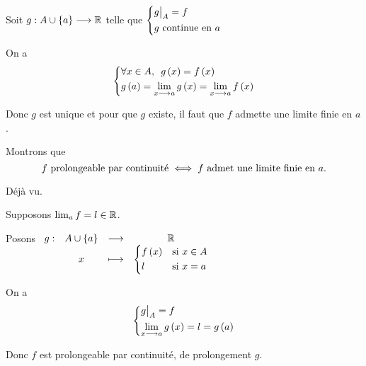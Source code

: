 \begin{dem}
\unicite

Soit \(g:A\cup\left\lbrace a\right\rbrace\longrightarrow\mathbb{R}\) telle que \(\begin{dcases}\restr{g}{A}=f \\ g\text{ continue en }a\end{dcases}\)

On a \[\begin{dcases}\quantifs{\forall x\in A}g\paren{x}=f\paren{x} \\ g\paren{a}=\lim_{x\to a}g\paren{x}=\lim_{x\to a}f\paren{x}\end{dcases}\]

Donc \(g\) est unique et pour que \(g\) existe, il faut que \(f\) admette une limite finie en \(a\).

\existence

Montrons que \[f\text{ prolongeable par continuité}\iff f\text{ admet une limite finie en }a.\]

\impdir Déjà vu.

\imprec

Supposons \(\lim_af=l\in\mathbb{R}\).

Posons \(\begin{array}[t]{cccc}g : & A\cup\left\lbrace a\right\rbrace & \longrightarrow & \mathbb{R} \\ & x & \longmapsto & \begin{dcases}f\left(x\right) &\text{si }x\in A \\ l &\text{si }x=a\end{dcases}\end{array}\)

On a \[\begin{dcases}\restr{g}{A}=f \\ \lim_{x\to a}g\paren{x}=l=g\paren{a}\end{dcases}\]

Donc \(f\) est prolongeable par continuité, de prolongement \(g\).
\end{dem}

